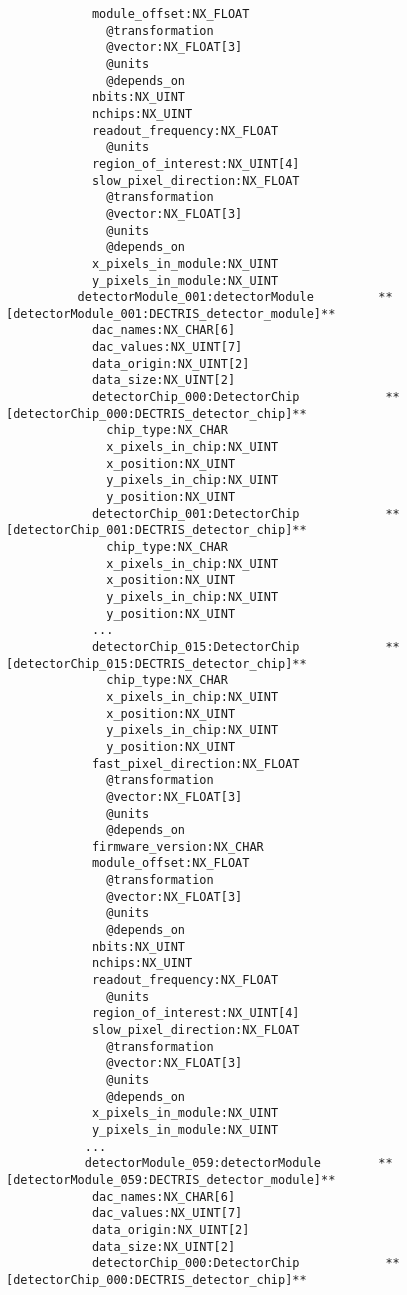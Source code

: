 \documentclass[11pt]{article}
\begin{document}
{{{\begin{verbatim}
            module_offset:NX_FLOAT
              @transformation
              @vector:NX_FLOAT[3]
              @units
              @depends_on
            nbits:NX_UINT
            nchips:NX_UINT
            readout_frequency:NX_FLOAT
              @units
            region_of_interest:NX_UINT[4]
            slow_pixel_direction:NX_FLOAT
              @transformation
              @vector:NX_FLOAT[3]
              @units
              @depends_on
            x_pixels_in_module:NX_UINT
            y_pixels_in_module:NX_UINT
          detectorModule_001:detectorModule         **[detectorModule_001:DECTRIS_detector_module]**
            dac_names:NX_CHAR[6]
            dac_values:NX_UINT[7]
            data_origin:NX_UINT[2]
            data_size:NX_UINT[2]
            detectorChip_000:DetectorChip            **[detectorChip_000:DECTRIS_detector_chip]**
              chip_type:NX_CHAR
              x_pixels_in_chip:NX_UINT
              x_position:NX_UINT
              y_pixels_in_chip:NX_UINT
              y_position:NX_UINT
            detectorChip_001:DetectorChip            **[detectorChip_001:DECTRIS_detector_chip]**
              chip_type:NX_CHAR
              x_pixels_in_chip:NX_UINT
              x_position:NX_UINT
              y_pixels_in_chip:NX_UINT
              y_position:NX_UINT
            ...  
            detectorChip_015:DetectorChip            **[detectorChip_015:DECTRIS_detector_chip]**
              chip_type:NX_CHAR
              x_pixels_in_chip:NX_UINT
              x_position:NX_UINT
              y_pixels_in_chip:NX_UINT
              y_position:NX_UINT
            fast_pixel_direction:NX_FLOAT
              @transformation
              @vector:NX_FLOAT[3]
              @units
              @depends_on
            firmware_version:NX_CHAR
            module_offset:NX_FLOAT
              @transformation
              @vector:NX_FLOAT[3]
              @units
              @depends_on
            nbits:NX_UINT
            nchips:NX_UINT
            readout_frequency:NX_FLOAT
              @units
            region_of_interest:NX_UINT[4]
            slow_pixel_direction:NX_FLOAT
              @transformation
              @vector:NX_FLOAT[3]
              @units
              @depends_on
            x_pixels_in_module:NX_UINT
            y_pixels_in_module:NX_UINT
           ...
           detectorModule_059:detectorModule        **[detectorModule_059:DECTRIS_detector_module]**
            dac_names:NX_CHAR[6]
            dac_values:NX_UINT[7]
            data_origin:NX_UINT[2]
            data_size:NX_UINT[2]
            detectorChip_000:DetectorChip            **[detectorChip_000:DECTRIS_detector_chip]**

\end{verbatim}}}}
\end{document}
